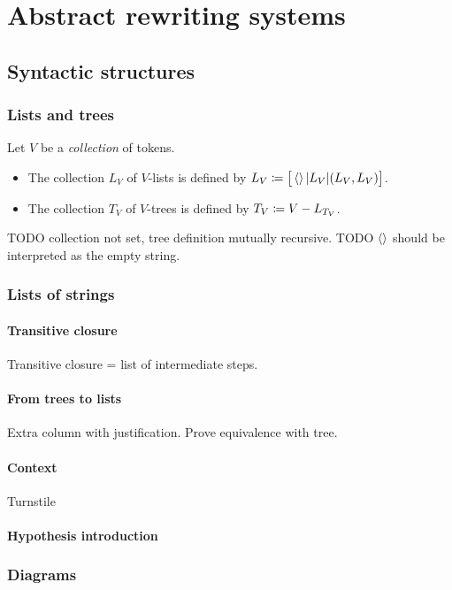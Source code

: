 \chapter{Abstract rewriting systems}
\section{Syntactic structures}
\subsection{Lists and trees}
\begin{definition}
Let $V$ be a \emph{collection} of tokens.
\begin{itemize}
\item The collection $L_V$ of $V$-lists is defined by $L_V \coloneqq \big[\left\langle  \right\rangle | L_V | (L_V,L_V)\big]$.
\item The collection $T_V$ of $V$-trees is defined by $T_V \coloneqq V - L_{T_V}$.
\end{itemize}
\end{definition}
TODO collection not set, tree definition mutually recursive. TODO $\left\langle  \right\rangle$ should be interpreted as the empty string.

\subsection{Lists of strings}
\subsubsection{Transitive closure}
Transitive closure = list of intermediate steps.

\subsubsection{From trees to lists}
Extra column with justification. Prove equivalence with tree.

\subsubsection{Context}
Turnstile
\subsubsection{Hypothesis introduction}



\subsection{Diagrams}
